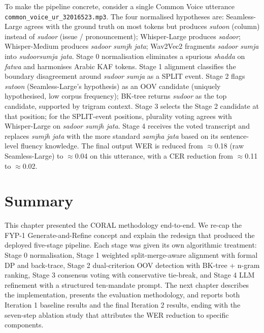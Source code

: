 To make the pipeline concrete, consider a single Common Voice utterance \texttt{common\_voice\_ur\_32016523.mp3}. The four normalised hypotheses are: Seamless-Large agrees with the ground truth on most tokens but produces \emph{sutoon} (column) instead of \emph{sudoor} (issue / pronouncement); Whisper-Large produces \emph{sadoor}; Whisper-Medium produces \emph{sadoor sumjh jata}; Wav2Vec2 fragments \emph{sadoor sumja} into \emph{sudoorsumja jata}. Stage 0 normalisation eliminates a spurious \emph{shadda} on \emph{fatwa} and harmonises Arabic KAF tokens. Stage 1 alignment classifies the boundary disagreement around \emph{sudoor sumja} as a SPLIT event. Stage 2 flags \emph{sutoon} (Seamless-Large's hypothesis) as an OOV candidate (uniquely hypothesised, low corpus frequency); BK-tree returns \emph{sudoor} as the top candidate, supported by trigram context. Stage 3 selects the Stage 2 candidate at that position; for the SPLIT-event positions, plurality voting agrees with Whisper-Large on \emph{sadoor sumjh jata}. Stage 4 receives the voted transcript and replaces \emph{sumjh jata} with the more standard \emph{samjha jata} based on its sentence-level fluency knowledge. The final output WER is reduced from $\approx$0.18 (raw Seamless-Large) to $\approx$0.04 on this utterance, with a CER reduction from $\approx$0.11 to $\approx$0.02.

\section{Summary}
\label{sec:ch3-summary}

This chapter presented the CORAL methodology end-to-end. We re-cap the FYP-1 Generate-and-Refine concept and explain the redesign that produced the deployed five-stage pipeline. Each stage was given its own algorithmic treatment: Stage 0 normalisation, Stage 1 weighted split-merge-aware alignment with formal DP and back-trace, Stage 2 dual-criterion OOV detection with BK-tree + n-gram ranking, Stage 3 consensus voting with conservative tie-break, and Stage 4 LLM refinement with a structured ten-mandate prompt. The next chapter describes the implementation, presents the evaluation methodology, and reports both Iteration 1 baseline results and the final Iteration 2 results, ending with the seven-step ablation study that attributes the WER reduction to specific components.
